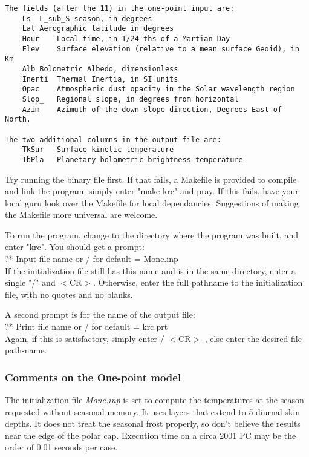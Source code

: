 \documentclass[draft]{article}  %
\newcommand{\qi}{\\ \hspace*{2.em}}      %
\newcommand{\nf}{\textit}  %
\begin{document}
\vspace{-3.mm} 
\begin{verbatim}
The fields (after the 11) in the one-point input are:
	Ls 	L_sub_S season, in degrees
	Lat	Aerographic latitude in degrees
	Hour	Local time, in 1/24'ths of a Martian Day
	Elev	Surface elevation (relative to a mean surface Geoid), in Km
	Alb	Bolometric Albedo, dimensionless
	Inerti	Thermal Inertia, in SI units
	Opac	Atmospheric dust opacity in the Solar wavelength region
	Slop_	Regional slope, in degrees from horizontal
	Azim	Azimuth of the down-slope direction, Degrees East of North.

The two additional columns in the output file are:
  	TkSur	Surface kinetic temperature
	TbPla	Planetary bolometric brightness temperature
\end{verbatim}

Try running the binary file first. If that fails, a Makefile is provided to
compile and link the program; simply enter "make krc" and pray. If this fails,
have your local guru look over the Makefile for local dependancies. Suggestions
of making the Makefile more universal are welcome.

To run the program, change to the directory where the program was built, and
enter "krc". You should get a prompt:
 \qi      ?* Input file name or / for default = Mone.inp  \\
If the initialization file still has this name and is in the same directory,
enter a single "/" and $<$CR$>$. Otherwise, enter the full pathname to the 
initialization file, with no quotes and no blanks.

A second prompt is for the name of the output file: 
 \qi         ?* Print file name or / for default = krc.prt \\
Again, if this is satisfactory, simply enter  / $<$CR$>$ , else enter the desired
file path-name.

\subsubsection{ Comments on the One-point model} %

The initialization file \nf{Mone.inp} is set to compute the temperatures at the
season requested without seasonal memory. It uses layers that extend to 5
diurnal skin depths. It does not treat the seasonal frost properly, so don't
believe the results near the edge of the polar cap. Execution time on a circa
2001 PC may be the order of 0.01 seconds per case.
\end{document}
